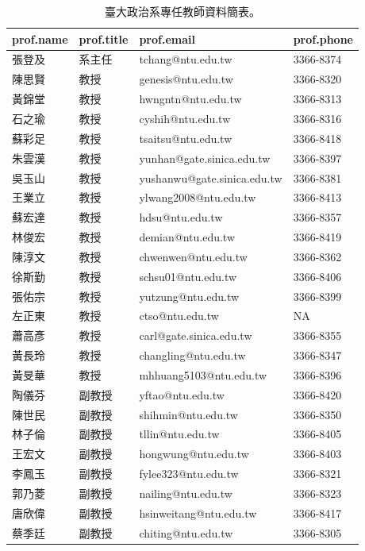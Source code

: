 \documentclass[
]{book}
\theoremstyle{definition}
\theoremstyle{remark}
\begin{document}
\begin{table}

\caption{\label{tab:unnamed-chunk-111}臺大政治系專任教師資料簡表。}
\centering
\begin{tabular}[t]{llll}
\toprule
prof.name & prof.title & prof.email & prof.phone\\
\midrule
張登及 & 系主任 & tchang@ntu.edu.tw & 3366-8374\\
陳思賢 & 教授 & genesis@ntu.edu.tw & 3366-8320\\
黃錦堂 & 教授 & hwngntn@ntu.edu.tw & 3366-8313\\
石之瑜 & 教授 & cyshih@ntu.edu.tw & 3366-8316\\
蘇彩足 & 教授 & tsaitsu@ntu.edu.tw & 3366-8418\\
\addlinespace
朱雲漢 & 教授 & yunhan@gate.sinica.edu.tw & 3366-8397\\
吳玉山 & 教授 & yushanwu@gate.sinica.edu.tw & 3366-8381\\
王業立 & 教授 & ylwang2008@ntu.edu.tw & 3366-8413\\
蘇宏達 & 教授 & hdsu@ntu.edu.tw & 3366-8357\\
林俊宏 & 教授 & demian@ntu.edu.tw & 3366-8419\\
\addlinespace
陳淳文 & 教授 & chwenwen@ntu.edu.tw & 3366-8362\\
徐斯勤 & 教授 & schsu01@ntu.edu.tw & 3366-8406\\
張佑宗 & 教授 & yutzung@ntu.edu.tw & 3366-8399\\
左正東 & 教授 & ctso@ntu.edu.tw & NA\\
蕭高彥 & 教授 & carl@gate.sinica.edu.tw & 3366-8355\\
\addlinespace
黃長玲 & 教授 & changling@ntu.edu.tw & 3366-8347\\
黃旻華 & 教授 & mhhuang5103@ntu.edu.tw & 3366-8396\\
陶儀芬 & 副教授 & yftao@ntu.edu.tw & 3366-8420\\
陳世民 & 副教授 & shihmin@ntu.edu.tw & 3366-8350\\
林子倫 & 副教授 & tllin@ntu.edu.tw & 3366-8405\\
\addlinespace
王宏文 & 副教授 & hongwung@ntu.edu.tw & 3366-8403\\
李鳳玉 & 副教授 & fylee323@ntu.edu.tw & 3366-8321\\
郭乃菱 & 副教授 & nailing@ntu.edu.tw & 3366-8323\\
唐欣偉 & 副教授 & hsinweitang@ntu.edu.tw & 3366-8417\\
蔡季廷 & 副教授 & chiting@ntu.edu.tw & 3366-8305\\

\end{tabular}
\end{table}
\end{document}
